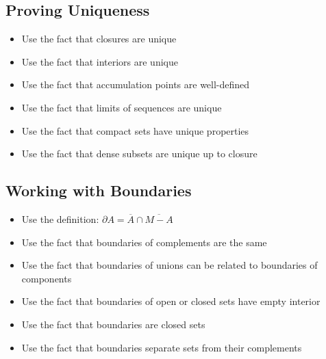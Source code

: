 \subsection*{Proving Uniqueness}
\begin{itemize}
\item Use the fact that closures are unique
\item Use the fact that interiors are unique
\item Use the fact that accumulation points are well-defined
\item Use the fact that limits of sequences are unique
\item Use the fact that compact sets have unique properties
\item Use the fact that dense subsets are unique up to closure
\end{itemize}

\subsection*{Working with Boundaries}
\begin{itemize}
\item Use the definition: $\partial A = \overline{A} \cap \overline{M - A}$
\item Use the fact that boundaries of complements are the same
\item Use the fact that boundaries of unions can be related to boundaries of components
\item Use the fact that boundaries of open or closed sets have empty interior
\item Use the fact that boundaries are closed sets
\item Use the fact that boundaries separate sets from their complements
\end{itemize}

